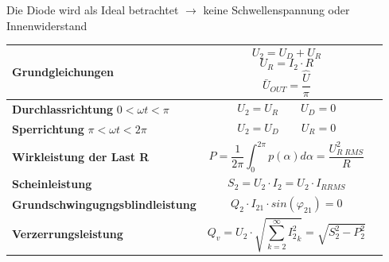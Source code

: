 Die Diode wird als Ideal betrachtet $ \rightarrow $ keine Schwellenspannung oder Innenwiderstand

\begin{longtable}{| p{} | p{} | p{} |} %
    \hline
    \textbf{Grundgleichungen}&
    \[ U_2 = U_D + U_R \]
    \[ U_R = I_2 \cdot R\]
    \[ \bar{U}_{OUT} = \dfrac{\hat{U}}{\pi}\]&\\
    \hline
    \textbf{Durchlassrichtung}\newline
    $ 0 < \omega t < \pi $&
    \[ U_2 = U_R \qquad U_D = 0 \]&\\
    \hline   
    \textbf{Sperrichtung}\newline
    $ \pi < \omega t < 2\pi $&
    \[ U_2=U_D \qquad U_R = 0 \]&\\
    \hline
    
    \textbf{Wirkleistung der Last R}&
    \[ P=\frac{1}{2\pi} \int_{0}^{2\pi} p(\alpha) d\alpha = \dfrac{U_{R\;RMS}^2}{R} \]&
    \\ \hline
    
    \textbf{Scheinleistung}&
    \[ S_2 = U_2 \cdot I_2 = U_2 \cdot I_{R RMS} \]&
    \\ \hline
        
    \textbf{Grundschwingugngsblindleistung}&
    \[ Q_2\cdot I_{2 1} \cdot sin(\varphi_{2 1}) = 0 \]&
    \\ \hline    
    
        
    \textbf{Verzerrungsleistung}&
    \[ Q_v = U_2 \cdot \sqrt{\sum_{k=2}^{\infty} {I_2^2}_k} = \sqrt{S_2^2 - P_2^2} \]&
    \\ \hline

\end{longtable}

